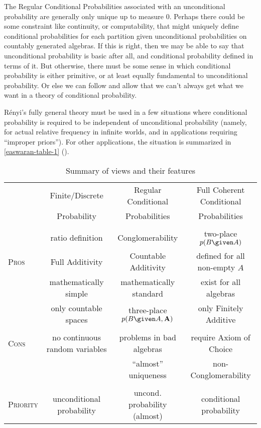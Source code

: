 The Regular Conditional Probabilities associated with an unconditional probability are generally only unique up to measure $0$. Perhaps there could be some constraint like continuity, or computability, that might uniquely define conditional probabilities for each partition given unconditional probabilities on countably generated algebras. If this is right, then we may be able to say that unconditional probability is basic after all, and conditional probability defined in terms of it. But otherwise, there must be some sense in which conditional probability is either primitive, or at least equally fundamental to unconditional probability. Or else we can follow \citet{myrvoldcant} and allow that we can't always get what we want in a theory of conditional probability.

R\'{e}nyi's fully general theory must be used in a few situations where conditional probability is required to be independent of unconditional probability (namely, for actual relative frequency in infinite worlds, and in applications requiring ``improper priors''). For other applications, the situation is summarized in \autoref{easwaran-table-1} ().
\begin{sidewaystable}[pht!]
\centering
\begin{tabular}{lccc}
 & Finite/Discrete & Regular Conditional & Full Coherent Conditional \\
  & Probability & Probabilities & Probabilities \\
 \hline\hline \\
  & ratio definition  & Conglomerability  & two-place $p(B \given A)$ \\
\textsc{Pros}  & Full Additivity & Countable Additivity & defined for all non-empty $A$ \\
  & mathematically simple & mathematically standard & exist for all algebras \\
  & only countable spaces & three-place $p(B \given A, \mathbf{A})$ & only Finitely Additive \\ \\
\textsc{Cons} & no continuous random variables & problems in bad algebras & require Axiom of Choice \\
  & & ``almost'' uniqueness & non-Conglomerability \\ \\
\textsc{Priority} & unconditional probability & uncond. probability (almost) & conditional probability\\
\end{tabular}
\caption{Summary of views and their features}\label{easwaran-table-1}
\end{sidewaystable}